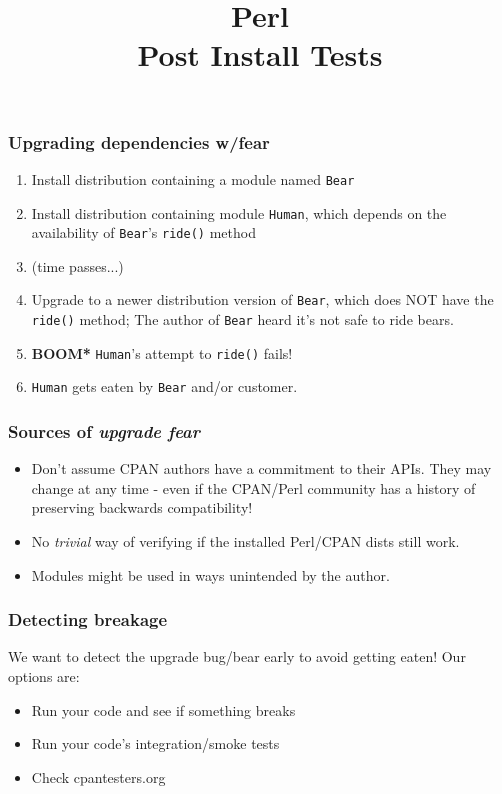 \documentclass[10pt]{beamer}
\title{Perl \\ Post Install Tests}
\begin{document}
\begin{frame}
\titlepage
\end{frame}


\begin{frame}[fragile]
\frametitle{Upgrading dependencies w/fear}
\begin{enumerate}
  \item Install distribution containing a module named \verb|Bear|
  \item Install distribution containing module \verb|Human|, which depends on the availability of \verb|Bear|'s \verb|ride()| method
  \item (time passes...)
  \item Upgrade to a newer distribution version of \verb|Bear|, which does NOT have the \verb|ride()| method; The author of \verb|Bear| heard it's not safe to ride bears.
  \item {\bf *BOOM*} \verb|Human|'s attempt to \verb|ride()| fails!
  \item \verb|Human| gets eaten by \verb|Bear| and/or customer.
\end{enumerate}
\end{frame}

\begin{frame}
\frametitle{Sources of \emph{upgrade fear}}
\begin{itemize}
  \item Don't assume CPAN authors have a commitment to their APIs. They may change at any time - even if the CPAN/Perl community has a history of preserving backwards compatibility!
  \item No \emph{trivial} way of verifying if the installed Perl/CPAN dists still work.
  \item Modules might be used in ways unintended by the author.
\end{itemize}
\end{frame}

\begin{frame}[fragile]
\frametitle{Detecting breakage}
We want to detect the upgrade bug/bear early to avoid getting eaten! Our options are:
\begin{itemize}
\item Run your code and see if something breaks
\item Run your code's integration/smoke tests
\item Check cpantesters.org
\end{itemize}
\end{frame}
\end{document}
